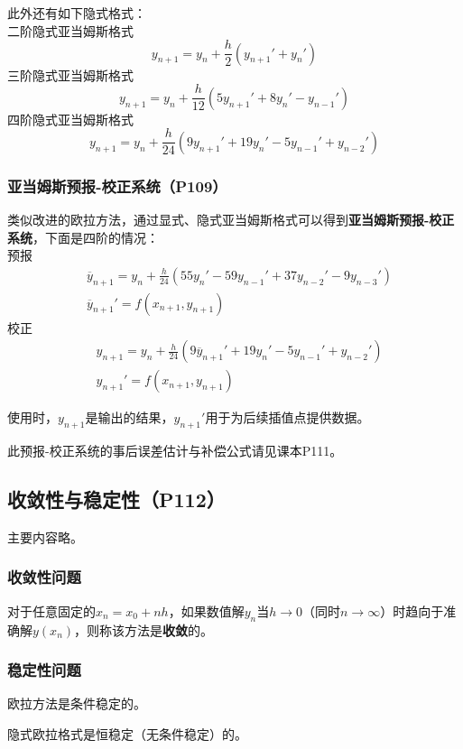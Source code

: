 \documentclass[fontset=ubuntu]{ctexart}
\numberwithin{equation}{section}
\numberwithin{theorem}{section}
\begin{document}
\begin{multicols}{2}
    此外还有如下隐式格式：\\
    二阶隐式亚当姆斯格式
    \begin{equation}
        y_{n+1}=y_n+\frac{h}{2}(y_{n+1}'+y_n')
    \end{equation}
    三阶隐式亚当姆斯格式
    \begin{equation}
        y_{n+1}=y_n+\frac{h}{12}(5y_{n+1}'+8y_n'-y_{n-1}')
    \end{equation}
    四阶隐式亚当姆斯格式
    \begin{equation}
        y_{n+1}=y_n+\frac{h}{24}(9y_{n+1}'+19y_n'-5y_{n-1}'+y_{n-2}')
    \end{equation}

    \subsubsection{亚当姆斯预报-校正系统（P109）}

    类似改进的欧拉方法，通过显式、隐式亚当姆斯格式可以得到\textbf{亚当姆斯预报-校正系统}，下面是四阶的情况：\\
    预报
    \begin{align*}
        & \overline{y}_{n+1}=y_n+\frac{h}{24}(55y_n'-59y_{n-1}'+37y_{n-2}'-9y_{n-3}') \\
        & \overline{y}_{n+1}'=f(x_{n+1},y_{n+1})
    \end{align*}
    校正
    \begin{align*}
        & y_{n+1}=y_n+\frac{h}{24}(9\overline{y}_{n+1}'+19y_n'-5y_{n-1}'+y_{n-2}') \\
        & y_{n+1}'=f(x_{n+1},y_{n+1})
    \end{align*}

    使用时，$y_{n+1}$是输出的结果，$y_{n+1}'$用于为后续插值点提供数据。

    此预报-校正系统的事后误差估计与补偿公式请见课本P111。

    \subsection{收敛性与稳定性（P112）}

    主要内容略。

    \subsubsection{收敛性问题}

    对于任意固定的$x_n=x_0+nh$，如果数值解$y_n$当$h\to 0$（同时$n\to\infty$）时趋向于准确解$y(x_n)$，则称该方法是\textbf{收敛}的。

    \subsubsection{稳定性问题}

    欧拉方法是条件稳定的。

    隐式欧拉格式是恒稳定（无条件稳定）的。

\end{multicols}
\end{document}
